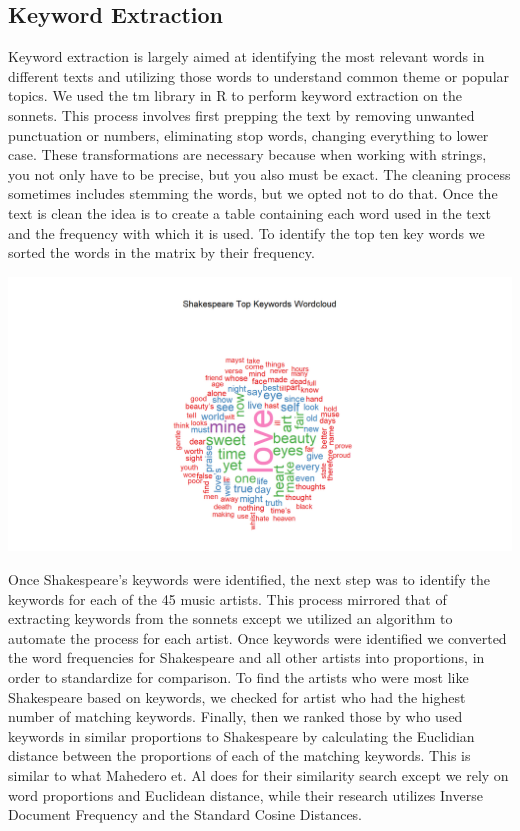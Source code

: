 \documentclass[11pt]{article}
\begin{document}
\subsection{Keyword Extraction}
Keyword extraction is largely aimed at identifying the most relevant words in different texts and utilizing those words to understand common theme or popular topics.\cite{monkey} We used the tm library in R to perform keyword extraction\cite{tm} on the sonnets. This process involves first prepping the text by removing unwanted punctuation or numbers, eliminating stop words, changing everything to lower case. These transformations are necessary because when working with strings, you not only have to be precise, but you also must be exact. The cleaning process sometimes includes stemming the words, but we opted not to do that. Once the text is clean the idea is to create a table containing each word used in the text and the frequency with which it is used. To identify the top ten key words we sorted the words in the matrix by their frequency. 
\begin{center}
\includegraphics[width=14cm]{_assets/Shakespeare_Keywords_WordCloud.png}
\end{center}

Once Shakespeare’s keywords were identified, the next step was to identify the keywords for each of the 45 music artists. This process mirrored that of extracting keywords from the sonnets except we utilized an algorithm to automate the process for each artist. Once keywords were identified we converted the word frequencies for Shakespeare and all other artists into proportions, in order to standardize for comparison. To find the artists who were most like Shakespeare based on keywords, we checked for artist who had the highest number of matching keywords. Finally, then we ranked those by who used keywords in similar proportions to Shakespeare by calculating the Euclidian distance between the proportions of each of the matching keywords. This is similar to what Mahedero et. Al \cite{NLP-for-lyrics} does for their similarity search except we rely on word proportions and Euclidean distance, while their research utilizes Inverse Document Frequency and the Standard Cosine Distances. 
\end{document}
